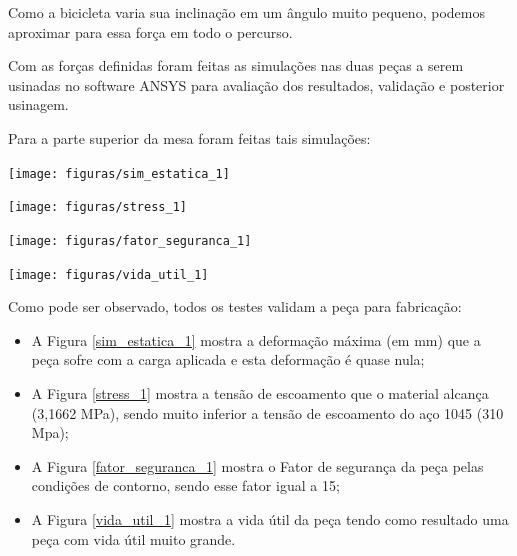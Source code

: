     Como a bicicleta varia sua inclinação em um ângulo muito pequeno, podemos aproximar para essa força em todo o percurso.

    Com as forças definidas foram feitas as simulações nas duas peças a serem usinadas no software ANSYS para avaliação dos resultados, validação e posterior usinagem.

    Para a parte superior da mesa foram feitas tais simulações:

     \begin{center}
        \texttt{[image: figuras/sim\_estatica\_1]}
        \label{sim_estatica_1}
    \end{center}
    
     \begin{center}
        \texttt{[image: figuras/stress\_1]}
        \label{stress_1}
    \end{center}

     \begin{center}
        \texttt{[image: figuras/fator\_seguranca\_1]}
        \label{fator_seguranca_1}
    \end{center}

     \begin{center}
        \texttt{[image: figuras/vida\_util\_1]}
        \label{vida_util_1}
    \end{center}

    Como pode ser observado, todos os testes validam a peça para fabricação:

    \begin{itemize}
        \item A Figura \ref{sim_estatica_1} mostra a deformação máxima (em mm) que a peça sofre com a carga aplicada e esta deformação é quase nula;
        \item A Figura \ref{stress_1}  mostra a tensão de escoamento que o material alcança (3,1662 MPa), sendo muito inferior a tensão de escoamento do aço 1045 (310 Mpa);
        \item A Figura \ref{fator_seguranca_1} mostra o Fator de segurança da peça pelas condições de contorno, sendo esse fator igual a 15;
        \item A Figura \ref{vida_util_1} mostra a vida útil da peça tendo como resultado uma peça com vida útil muito grande.
    \end{itemize}
  
